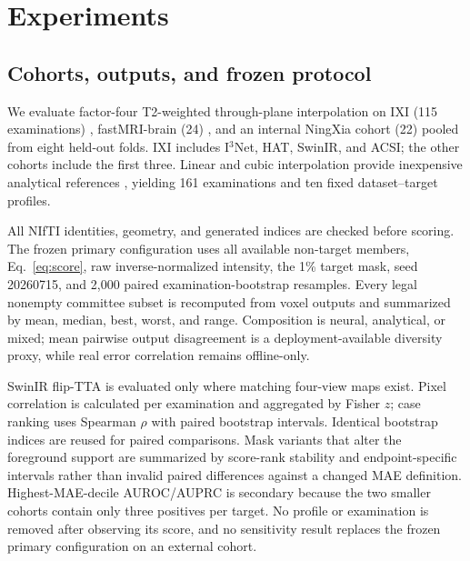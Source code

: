 \documentclass{article}
\begin{document}
\section{Experiments}
\subsection{Cohorts, outputs, and frozen protocol}
We evaluate factor-four T2-weighted through-plane interpolation on IXI (115 examinations) \cite{ixi}, fastMRI-brain (24) \cite{zbontar2018fastmri}, and an internal NingXia cohort (22) pooled from eight held-out folds. IXI includes I$^3$Net, HAT, SwinIR, and ACSI; the other cohorts include the first three. Linear and cubic interpolation provide inexpensive analytical references \cite{keys1981cubic,thevenaz2000interpolation,unser1999splines}, yielding 161 examinations and ten fixed dataset--target profiles.

\begin{table}[H]
 \centering
 \caption{Cohorts and stored neural outputs. Analytical references are available for every profile.}
 \resizebox{\columnwidth}{!}{}
 \label{tab:protocol}
\end{table}

All NIfTI identities, geometry, and generated indices are checked before scoring. The frozen primary configuration uses all available non-target members, Eq.~\eqref{eq:score}, raw inverse-normalized intensity, the 1\% target mask, seed 20260715, and 2,000 paired examination-bootstrap resamples. Every legal nonempty committee subset is recomputed from voxel outputs and summarized by mean, median, best, worst, and range. Composition is neural, analytical, or mixed; mean pairwise output disagreement is a deployment-available diversity proxy, while real error correlation remains offline-only.

SwinIR flip-TTA is evaluated only where matching four-view maps exist. Pixel correlation is calculated per examination and aggregated by Fisher $z$; case ranking uses Spearman $\rho$ with paired bootstrap intervals. Identical bootstrap indices are reused for paired comparisons. Mask variants that alter the foreground support are summarized by score-rank stability and endpoint-specific intervals rather than invalid paired differences against a changed MAE definition. Highest-MAE-decile AUROC/AUPRC is secondary because the two smaller cohorts contain only three positives per target. No profile or examination is removed after observing its score, and no sensitivity result replaces the frozen primary configuration on an external cohort.
\end{document}
